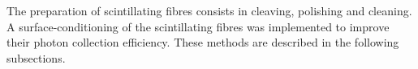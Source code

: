 The preparation of scintillating fibres consists in cleaving, polishing and cleaning. A surface-conditioning of the scintillating fibres was implemented to improve their photon collection efficiency. These methods are described in the following subsections.

